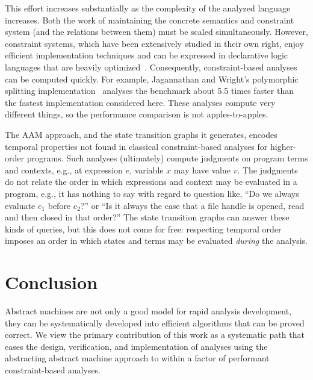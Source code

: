 \documentclass[preprint,onecolumn,9pt]{sigplanconf} %
\begin{document}
This effort increases substantially as the complexity of the analyzed language increases.
%
Both the work of maintaining the concrete semantics and constraint system (and the relations between them) must be scaled simultaneously.
%
However, constraint systems, which have been extensively studied in their own right, enjoy efficient implementation techniques and can be expressed in declarative logic languages that are heavily optimized~\cite{dvanhorn:bravenboer-smaragdakis-oopsla09}.
%
Consequently, constraint-based analyses can be computed quickly.
%
For example, Jagannathan and Wright's polymorphic splitting implementation~\cite{dvanhorn:wright-jagannathan-toplas98} analyses the \Church{} benchmark about 5.5 times faster than the fastest implementation considered here.
%
These analyses compute very different things, so the performance comparison is not apples-to-apples.

The AAM approach, and the state transition graphs it generates, encodes temporal properties not found in classical constraint-based analyses for higher-order programs.
%
Such analyses (ultimately) compute judgments on program terms and contexts, e.g., at expression $e$, variable $x$ may have value $v$.
%
The judgments do not relate the order in which expressions and context may be evaluated in a program, e.g., it has nothing to say with regard to question like,
%
``Do we always evaluate $e_1$ before $e_2$?'' or
%
``Is it always the case that a file handle is opened, read and then closed in that order?''
%
The state transition graphs can answer these kinds of queries, but this does not come for free: respecting temporal order imposes an order in which states and terms may be evaluated \emph{during} the analysis.

\section{Conclusion}
\label{sec:conclusion}

Abstract machines are not only a good model for rapid analysis development, they can be systematically developed into efficient algorithms that can be proved correct.
%
We view the primary contribution of this work as a systematic path that eases the design, verification, and implementation of analyses using the abstracting abstract machine approach to within a factor of performant constraint-based analyses.

\end{document}
